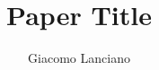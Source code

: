 \documentclass[a4paper,10pt,twocolumn]{article}
\begin{document}
\title{
    Paper Title
}

\author{Giacomo Lanciano}

\maketitle

\begin{abstract}
    
\end{abstract}










\end{document}
